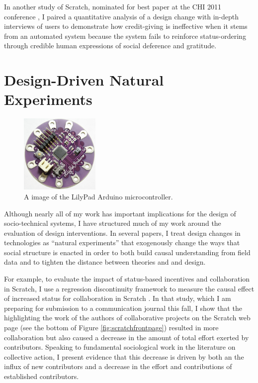 \documentclass[10pt]{memoir}
\begin{document}
In another study of Scratch, nominated for best paper at the CHI 2011
conference \cite{monroy-hernandez_computers_2011}, I paired a
quantitative analysis of a design change with in-depth interviews of
users to demonstrate how credit-giving is ineffective when it stems
from an automated system because the system fails to reinforce
status-ordering through credible human expressions of social deference
and gratitude.

\section{Design-Driven Natural Experiments}

\begin{figure}
 \begin{centering}
 \includegraphics[width=1.5in]{figures/lilypad.png}
 \caption{A image of the LilyPad Arduino microcontroller.}
 \label{fig:lilypad}
 \end{centering}
\end{figure}

Although nearly all of my work has important implications for the
design of socio-technical systems, I have structured much of my work
around the evaluation of design interventions. In several papers, I
treat design changes in technologies as ``natural experiments'' that
exogenously change the ways that social structure is enacted in order
to both build causal understanding from field data and to tighten the
distance between theories and and design.

For example, to evaluate the impact of status-based incentives and
collaboration in Scratch, I use a regression discontinuity framework
to measure the causal effect of increased status for collaboration in
Scratch \cite{hill_causal_2012}. In that study, which I am preparing
for submission to a communication journal this fall, I show that the
highlighting the work of the authors of collaborative projects on the
Scratch web page (see the bottom of Figure \ref{fig:scratchfrontpage})
resulted in more collaboration but also caused a decrease in the
amount of total effort exerted by contributors. Speaking to
fundamental sociological work in the literature on collective action,
I present evidence that this decrease is driven by both an the influx
of new contributors and a decrease in the effort and contributions of
established contributors.
\end{document}
